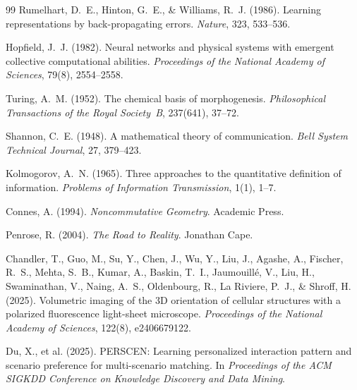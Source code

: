 \documentclass[12pt, a4paper, openany]{book}
\theoremstyle{plain}
\theoremstyle{definition}
\theoremstyle{remark}
\begin{document}
\begin{thebibliography}{99}
Rumelhart, D.~E., Hinton, G.~E., \& Williams, R.~J. (1986).
Learning representations by back-propagating errors.
\textit{Nature}, 323, 533--536.

Hopfield, J.~J. (1982).
Neural networks and physical systems with emergent collective computational abilities.
\textit{Proceedings of the National Academy of Sciences}, 79(8), 2554--2558.

Turing, A.~M. (1952).
The chemical basis of morphogenesis.
\textit{Philosophical Transactions of the Royal Society~B}, 237(641), 37--72.

Shannon, C.~E. (1948).
A mathematical theory of communication.
\textit{Bell System Technical Journal}, 27, 379--423.

Kolmogorov, A.~N. (1965).
Three approaches to the quantitative definition of information.
\textit{Problems of Information Transmission}, 1(1), 1--7.

Connes, A. (1994).
\textit{Noncommutative Geometry}.
Academic Press.

Penrose, R. (2004).
\textit{The Road to Reality}.
Jonathan Cape.

Chandler, T., Guo, M., Su, Y., Chen, J., Wu, Y., Liu, J., Agashe, A., Fischer, R.~S.,
Mehta, S.~B., Kumar, A., Baskin, T.~I., Jaumouillé, V., Liu, H., Swaminathan, V.,
Naing, A.~S., Oldenbourg, R., La Riviere, P.~J., \& Shroff, H. (2025).
Volumetric imaging of the 3D orientation of cellular structures with a polarized
fluorescence light-sheet microscope.
\textit{Proceedings of the National Academy of Sciences}, 122(8), e2406679122.

Du, X., et al. (2025).
PERSCEN: Learning personalized interaction pattern and scenario preference for
multi-scenario matching.
In \textit{Proceedings of the ACM SIGKDD Conference on Knowledge Discovery and Data Mining}.

\end{thebibliography}
\end{document}
